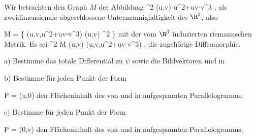{

Wir betrachten den Graph $M$ der Abbildung
\maabbeledisp {\varphi} {\R^2} {\R
} {(u,v)} { u^2+uv-v^3
} {,} als zweidimensionale abgeschlossene Untermannigfaltigkeit des $\R^3$, also

\mavergleichskettedisp
{\vergleichskette
{ M
}
{ =} { \left\{ (u,v,u^2+uv-v^3)  \mid  (u,v) \in \R^2         \right\}
}
{ } {
}
{ } {
}
{ } {
}
}
{}{}{}
mit der vom $\R^3$ induzierten riemannschen Metrik. Es sei
\maabbeledisp {\psi} {\R^2} { M
} {(u,v)} { (u,v,u^2+uv-v^3)
} {,}
die zugehörige Diffeomorphie.

a) Bestimme das totale Differential zu $\psi$ sowie die Bildvektoren
 und
 in

b) Bestimme für jeden Punkt der Form

\mavergleichskette
{\vergleichskette
{ P
}
{ = }{ (u,0)
}
{  }{
}
{    }{
}
{   }{
}
}
{}{}{}
den Flächeninhalt des von
 und
 in
 aufgespannten Parallelogramms.

c) Bestimme für jeden Punkt der Form

\mavergleichskette
{\vergleichskette
{ P
}
{ = }{ (0,v)
}
{  }{
}
{    }{
}
{   }{
}
}
{}{}{}
den Flächeninhalt des von
 und
 in
 aufgespannten Parallelogramms.

}
